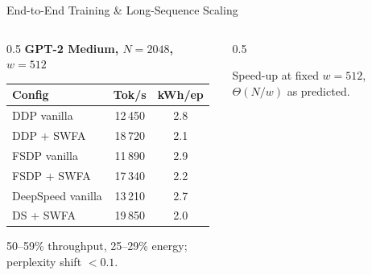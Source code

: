 \documentclass[10pt,aspectratio=169]{beamer}
\begin{document}
\begin{frame}{End-to-End Training \& Long-Sequence Scaling}
  \begin{columns}[T]
    \begin{column}{0.5\textwidth}
      \scriptsize\centering
      \textbf{GPT-2 Medium, $N{=}2048$, $w{=}512$}\\
      \begin{tabular}{@{}lcc@{}}
        \toprule
        Config & Tok/s & kWh/ep\\
        \midrule
        DDP vanilla       & 12\,450 & 2.8\\
        DDP + SWFA        & \alert{18\,720} & \alert{2.1}\\
        FSDP vanilla      & 11\,890 & 2.9\\
        FSDP + SWFA       & \alert{17\,340} & \alert{2.2}\\
        DeepSpeed vanilla & 13\,210 & 2.7\\
        DS + SWFA         & \alert{19\,850} & \alert{2.0}\\
        \bottomrule
      \end{tabular}
      \vspace{1ex}
      \alert{50--59\%} throughput, \alert{25--29\%} energy;
      perplexity shift $<\!0.1$.
    \end{column}
    \begin{column}{0.5\textwidth}
      \scriptsize\centering
      Speed-up at fixed $w{=}512$, $\Theta(N/w)$ as predicted.
    \end{column}
  \end{columns}
\end{frame}
\end{document}
